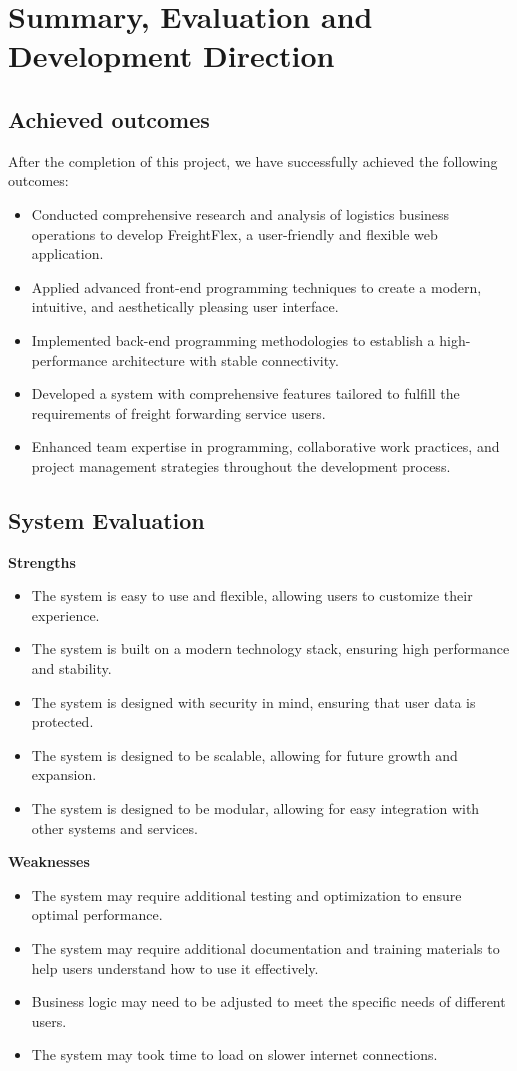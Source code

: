 \chapter{Summary, Evaluation and Development Direction}
\section{Achieved outcomes}
After the completion of this project, we have successfully achieved the following outcomes:
\begin{itemize}
  \item Conducted comprehensive research and analysis of logistics business operations to develop FreightFlex, a user-friendly and flexible web application.
  \item Applied advanced front-end programming techniques to create a modern, intuitive, and aesthetically pleasing user interface.
  \item Implemented back-end programming methodologies to establish a high-performance architecture with stable connectivity.
  \item Developed a system with comprehensive features tailored to fulfill the requirements of freight forwarding service users.
  \item Enhanced team expertise in programming, collaborative work practices, and project management strategies throughout the development process.
\end{itemize}
\section{System Evaluation}
\noindent \textbf{Strengths}
\begin{itemize}
  \item The system is easy to use and flexible, allowing users to customize their experience.
  \item The system is built on a modern technology stack, ensuring high performance and stability.
  \item The system is designed with security in mind, ensuring that user data is protected.
  \item The system is designed to be scalable, allowing for future growth and expansion.
  \item The system is designed to be modular, allowing for easy integration with other systems and services.
\end{itemize}
\noindent \textbf{Weaknesses}
\begin{itemize}
  \item The system may require additional testing and optimization to ensure optimal performance.
  \item The system may require additional documentation and training materials to help users understand how to use it effectively.
  \item Business logic may need to be adjusted to meet the specific needs of different users.
  \item The system may took time to load on slower internet connections.
\end{itemize}
